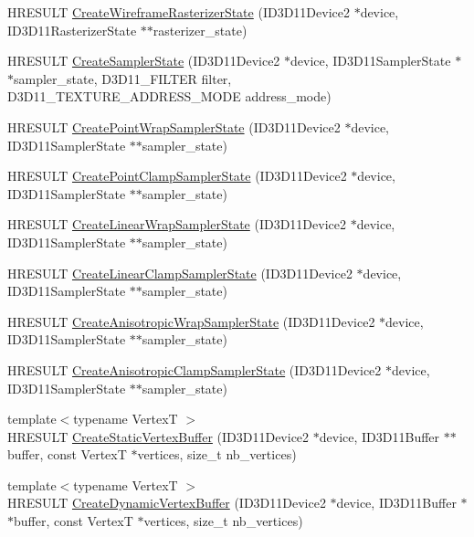 \begin{DoxyCompactItemize}
H\+R\+E\+S\+U\+LT \hyperlink{namespacemage_a697c6623ef997684945849dc04437a1a}{Create\+Wireframe\+Rasterizer\+State} (I\+D3\+D11\+Device2 $\ast$device, I\+D3\+D11\+Rasterizer\+State $\ast$$\ast$rasterizer\+\_\+state)
\item 
H\+R\+E\+S\+U\+LT \hyperlink{namespacemage_aba8cfdff9edf018ab6ebe2f3f72a2095}{Create\+Sampler\+State} (I\+D3\+D11\+Device2 $\ast$device, I\+D3\+D11\+Sampler\+State $\ast$$\ast$sampler\+\_\+state, D3\+D11\+\_\+\+F\+I\+L\+T\+ER filter, D3\+D11\+\_\+\+T\+E\+X\+T\+U\+R\+E\+\_\+\+A\+D\+D\+R\+E\+S\+S\+\_\+\+M\+O\+DE address\+\_\+mode)
\item 
H\+R\+E\+S\+U\+LT \hyperlink{namespacemage_a172296a60b063da1f01ad0a4ec828772}{Create\+Point\+Wrap\+Sampler\+State} (I\+D3\+D11\+Device2 $\ast$device, I\+D3\+D11\+Sampler\+State $\ast$$\ast$sampler\+\_\+state)
\item 
H\+R\+E\+S\+U\+LT \hyperlink{namespacemage_a9f3a3ef8e9a08654f98dfaa2e6c77da8}{Create\+Point\+Clamp\+Sampler\+State} (I\+D3\+D11\+Device2 $\ast$device, I\+D3\+D11\+Sampler\+State $\ast$$\ast$sampler\+\_\+state)
\item 
H\+R\+E\+S\+U\+LT \hyperlink{namespacemage_a714981745a2e53e5c55b04c4441bd2d0}{Create\+Linear\+Wrap\+Sampler\+State} (I\+D3\+D11\+Device2 $\ast$device, I\+D3\+D11\+Sampler\+State $\ast$$\ast$sampler\+\_\+state)
\item 
H\+R\+E\+S\+U\+LT \hyperlink{namespacemage_aa8f37da8dc3c10b5e4e1cd56be94ff95}{Create\+Linear\+Clamp\+Sampler\+State} (I\+D3\+D11\+Device2 $\ast$device, I\+D3\+D11\+Sampler\+State $\ast$$\ast$sampler\+\_\+state)
\item 
H\+R\+E\+S\+U\+LT \hyperlink{namespacemage_a38bc123db04b8434276d3a350b5acc7f}{Create\+Anisotropic\+Wrap\+Sampler\+State} (I\+D3\+D11\+Device2 $\ast$device, I\+D3\+D11\+Sampler\+State $\ast$$\ast$sampler\+\_\+state)
\item 
H\+R\+E\+S\+U\+LT \hyperlink{namespacemage_af85f5fe2b35fb8992c3eea69e87ad039}{Create\+Anisotropic\+Clamp\+Sampler\+State} (I\+D3\+D11\+Device2 $\ast$device, I\+D3\+D11\+Sampler\+State $\ast$$\ast$sampler\+\_\+state)
\item 
{\footnotesize template$<$typename VertexT $>$ }\\H\+R\+E\+S\+U\+LT \hyperlink{namespacemage_a7cf0754e3bc2681bc1990e64f4155032}{Create\+Static\+Vertex\+Buffer} (I\+D3\+D11\+Device2 $\ast$device, I\+D3\+D11\+Buffer $\ast$$\ast$buffer, const VertexT $\ast$vertices, size\+\_\+t nb\+\_\+vertices)
\item 
{\footnotesize template$<$typename VertexT $>$ }\\H\+R\+E\+S\+U\+LT \hyperlink{namespacemage_aeb9bab1a9d739e3908c90db3832d9053}{Create\+Dynamic\+Vertex\+Buffer} (I\+D3\+D11\+Device2 $\ast$device, I\+D3\+D11\+Buffer $\ast$$\ast$buffer, const VertexT $\ast$vertices, size\+\_\+t nb\+\_\+vertices)

\end{DoxyCompactItemize}
